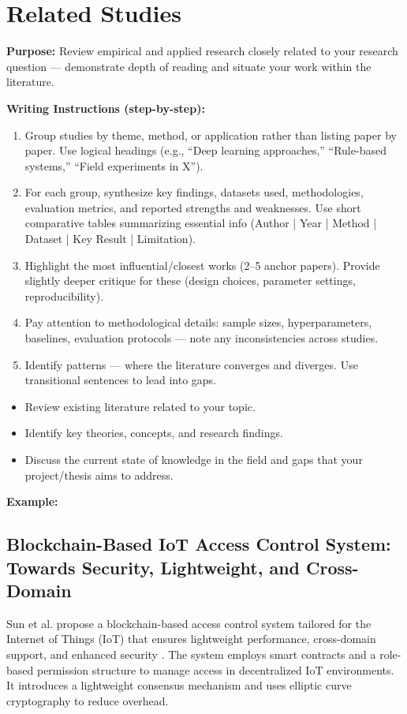 \section{Related Studies}

{\color{blue}\textbf{Purpose:}
Review empirical and applied research closely related to your research question — demonstrate depth of reading and situate your work within the literature.} \\

{\color{red}\textbf{Writing Instructions (step-by-step):}
\begin{enumerate}
    \item Group studies by theme, method, or application rather than listing paper by paper. Use logical headings (e.g., ``Deep learning approaches,'' ``Rule-based systems,'' ``Field experiments in X'').
    
    \item For each group, synthesize key findings, datasets used, methodologies, evaluation metrics, and reported strengths and weaknesses. Use short comparative tables summarizing essential info (Author | Year | Method | Dataset | Key Result | Limitation).
    
    \item Highlight the most influential/closest works (2–5 anchor papers). Provide slightly deeper critique for these (design choices, parameter settings, reproducibility).
    
    \item Pay attention to methodological details: sample sizes, hyperparameters, baselines, evaluation protocols — note any inconsistencies across studies.
    
    \item Identify patterns — where the literature converges and diverges. Use transitional sentences to lead into gaps.
\end{enumerate}


\begin{itemize}
     \item Review existing literature related to your topic.
     \item Identify key theories, concepts, and research findings.
     \item Discuss the current state of knowledge in the field and gaps that your project/thesis aims to address.
\end{itemize} }


\textbf{ \color{blue} Example:}


\subsection*{Blockchain-Based IoT Access Control System: Towards Security, Lightweight, and Cross-Domain}
Sun et al. propose a blockchain-based access control system tailored for the Internet of Things (IoT) that ensures lightweight performance, cross-domain support, and enhanced security \cite{Sun2021}. The system employs smart contracts and a role-based permission structure to manage access in decentralized IoT environments. It introduces a lightweight consensus mechanism and uses elliptic curve cryptography to reduce overhead.





